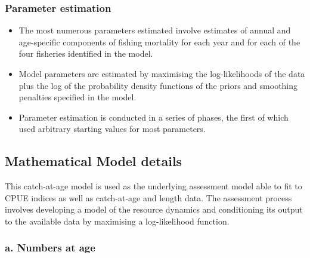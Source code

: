 \documentclass{article}
\begin{document}

\subsubsection{Parameter estimation}

\begin{itemize}

\item The most numerous parameters estimated involve estimates of annual and age-specific components of fishing mortality for each year and for each of the four fisheries identified in the model.

\item Model parameters are estimated by maximising the log-likelihoods of the data plus the log of the probability density functions of the priors and smoothing penalties specified in the model.

\item Parameter estimation is conducted in a series of phases, the first of which used arbitrary starting values for most parameters.

\end{itemize}

\subsection{Mathematical Model details}

This catch-at-age model is used as the underlying assessment model able to fit to CPUE indices as well as catch-at-age and length data. The assessment process involves developing a model of the resource dynamics and conditioning its output to the available data by maximising a log-likelihood function.


\subsubsection{a. Numbers at age}
\end{document}

